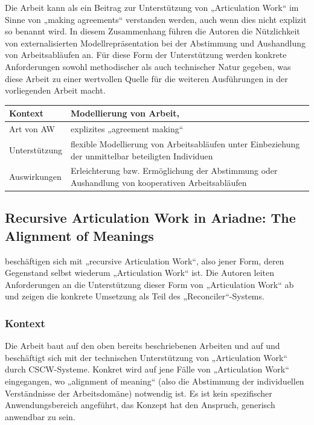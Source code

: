 Die Arbeit kann als ein Beitrag zur Unterstützung von „Articulation Work“ im Sinne von „making agreements“ verstanden werden, auch wenn dies nicht explizit so benannt wird. In diesem Zusammenhang führen die Autoren die Nützlichkeit von externalisierten Modellrepräsentation bei der Abstimmung und Aushandlung von Arbeitsabläufen an. Für diese Form der Unterstützung werden konkrete Anforderungen sowohl methodischer als auch technischer Natur gegeben, was diese Arbeit zu einer wertvollen Quelle für die weiteren Ausführungen in der vorliegenden Arbeit macht.
\\[1em]
\begin{tabular}{| p{3cm} | p{10cm} |}
  \hline
  Kontext & Modellierung von Arbeit,  \\ \hline
  Art von AW & explizites „agreement making“ \\ \hline
  Unterstützung & flexible Modellierung von Arbeitsabläufen unter Einbeziehung der unmittelbar beteiligten Individuen \\ \hline
  Auswirkungen & Erleichterung bzw. Ermöglichung der Abstimmung oder Aushandlung von kooperativen Arbeitsabläufen \\ \hline
\end{tabular}


\subsection{Recursive Articulation Work in Ariadne: The Alignment of Meanings}
\label{sub:recursive_articulation_work_in_ariadne}

\citep{Sarini02} beschäftigen sich mit „recursive Articulation Work“, also jener Form, deren Gegenstand selbst wiederum „Articulation Work“ ist. Die Autoren leiten Anforderungen an die Unterstützung dieser Form von „Articulation Work“ ab und zeigen die konkrete Umsetzung als Teil des „Reconciler“-Systems.

\subsubsection{Kontext}

Die Arbeit baut auf den oben bereits beschriebenen Arbeiten \citep{Schmidt92} und \citep{Divitini00} auf und beschäftigt sich mit der technischen Unterstützung von „Articulation Work“ durch \gls{CSCW}-Systeme. Konkret wird auf jene Fälle von „Articulation Work“ eingegangen, wo „alignment of meaning“ (also die Abstimmung der individuellen Verständnisse der Arbeitsdomäne) notwendig ist. Es ist kein spezifischer Anwendungsbereich angeführt, das Konzept hat den Anspruch, generisch anwendbar zu sein.

